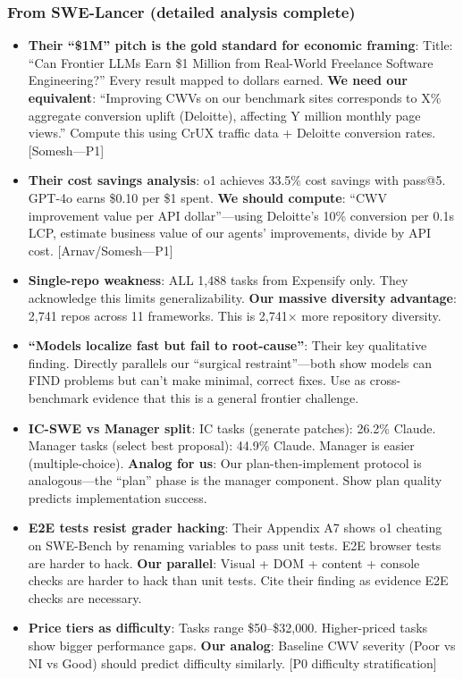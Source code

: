 \subsubsection{From SWE-Lancer (detailed analysis complete)}
\begin{itemize}
    \item \textbf{Their ``\$1M'' pitch is the gold standard for economic framing}: Title: ``Can Frontier LLMs Earn \$1 Million from Real-World Freelance Software Engineering?'' Every result mapped to dollars earned. \textbf{We need our equivalent}: ``Improving CWVs on our benchmark sites corresponds to X\% aggregate conversion uplift (Deloitte), affecting Y million monthly page views.'' Compute this using CrUX traffic data + Deloitte conversion rates. [Somesh---P1]
    \item \textbf{Their cost savings analysis}: o1 achieves 33.5\% cost savings with pass@5. GPT-4o earns \$0.10 per \$1 spent. \textbf{We should compute}: ``CWV improvement value per API dollar''---using Deloitte's 10\% conversion per 0.1s LCP, estimate business value of our agents' improvements, divide by API cost. [Arnav/Somesh---P1]
    \item \textbf{Single-repo weakness}: ALL 1,488 tasks from Expensify only. They acknowledge this limits generalizability. \textbf{Our massive diversity advantage}: 2,741 repos across 11 frameworks. This is 2,741$\times$ more repository diversity.
    \item \textbf{``Models localize fast but fail to root-cause''}: Their key qualitative finding. Directly parallels our ``surgical restraint''---both show models can FIND problems but can't make minimal, correct fixes. Use as cross-benchmark evidence that this is a general frontier challenge.
    \item \textbf{IC-SWE vs Manager split}: IC tasks (generate patches): 26.2\% Claude. Manager tasks (select best proposal): 44.9\% Claude. Manager is easier (multiple-choice). \textbf{Analog for us}: Our plan-then-implement protocol is analogous---the ``plan'' phase is the manager component. Show plan quality predicts implementation success.
    \item \textbf{E2E tests resist grader hacking}: Their Appendix A7 shows o1 cheating on SWE-Bench by renaming variables to pass unit tests. E2E browser tests are harder to hack. \textbf{Our parallel}: Visual + DOM + content + console checks are harder to hack than unit tests. Cite their finding as evidence E2E checks are necessary.
    \item \textbf{Price tiers as difficulty}: Tasks range \$50--\$32,000. Higher-priced tasks show bigger performance gaps. \textbf{Our analog}: Baseline CWV severity (Poor vs NI vs Good) should predict difficulty similarly. [P0 difficulty stratification]

\end{itemize}
